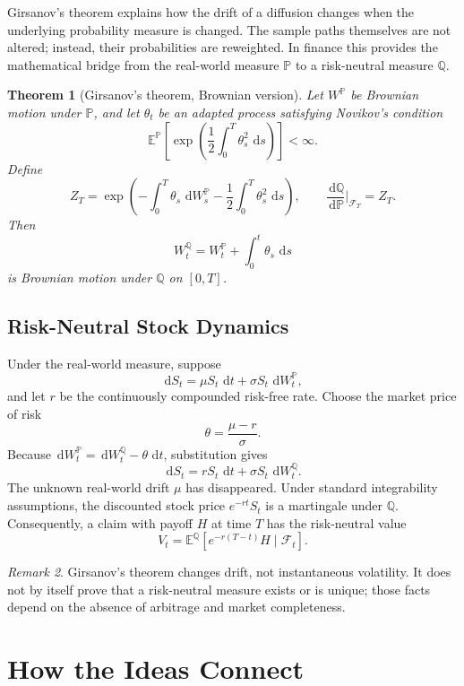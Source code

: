 \documentclass[12pt,openany]{book}
\newtheorem{theorem}{Theorem}[section]
\theoremstyle{definition}
\theoremstyle{remark}
\newtheorem{remark}[theorem]{Remark}
\newcommand{\E}{\mathbb{E}}
\newcommand{\Prob}{\mathbb{P}}
\newcommand{\Fscr}{\mathcal{F}}
\newcommand{\dd}{\,\mathrm{d}}
\begin{document}
Girsanov's theorem explains how the drift of a diffusion changes when the
underlying probability measure is changed.  The sample paths themselves are
not altered; instead, their probabilities are reweighted.  In finance this
provides the mathematical bridge from the real-world measure \(\Prob\) to a
risk-neutral measure \(\mathbb{Q}\).

\begin{theorem}[Girsanov's theorem, Brownian version]
Let \(W^{\Prob}\) be Brownian motion under \(\Prob\), and let
\(\theta_t\) be an adapted process satisfying Novikov's condition
\[
\E^{\Prob}\!\left[
\exp\!\left(\frac12\int_0^T\theta_s^2\,\dd s\right)
\right]<\infty.
\]
Define
\[
Z_T=\exp\!\left(
-\int_0^T\theta_s\,\dd W_s^{\Prob}
-\frac12\int_0^T\theta_s^2\,\dd s
\right),
\qquad
\frac{\dd\mathbb{Q}}{\dd\Prob}\bigg|_{\Fscr_T}=Z_T.
\]
Then
\[
\boxed{
W_t^{\mathbb{Q}}
=W_t^{\Prob}+\int_0^t\theta_s\,\dd s
}
\]
is Brownian motion under \(\mathbb{Q}\) on \([0,T]\).
\end{theorem}

\subsection{Risk-Neutral Stock Dynamics}

Under the real-world measure, suppose
\[
\dd S_t=\mu S_t\,\dd t+\sigma S_t\,\dd W_t^{\Prob},
\]
and let \(r\) be the continuously compounded risk-free rate.  Choose the
market price of risk
\[
\theta=\frac{\mu-r}{\sigma}.
\]
Because \(\dd W_t^{\Prob}=\dd W_t^{\mathbb{Q}}-\theta\,\dd t\), substitution
gives
\[
\boxed{
\dd S_t=rS_t\,\dd t+\sigma S_t\,\dd W_t^{\mathbb{Q}}.
}
\]
The unknown real-world drift \(\mu\) has disappeared.  Under standard
integrability assumptions, the discounted stock price
\(e^{-rt}S_t\) is a martingale under \(\mathbb{Q}\).  Consequently, a claim
with payoff \(H\) at time \(T\) has the risk-neutral value
\[
\boxed{
V_t=\E^{\mathbb{Q}}\!\left[
e^{-r(T-t)}H\mid\Fscr_t
\right].
}
\]

\begin{remark}
Girsanov's theorem changes drift, not instantaneous volatility.  It does not
by itself prove that a risk-neutral measure exists or is unique; those facts
depend on the absence of arbitrage and market completeness.
\end{remark}

\section{How the Ideas Connect}
\end{document}
